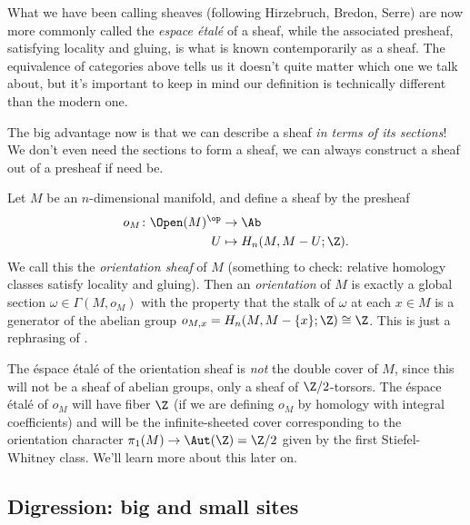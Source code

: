 \documentclass[11pt]{book}
\begin{document}
\begin{remark}[Important] What we have been calling sheaves (following Hirzebruch, Bredon, Serre) are now more commonly called the \emph{espace \'etal\'e} of a sheaf, while the associated presheaf, satisfying locality and gluing, is what is known contemporarily as a sheaf. The equivalence of categories above tells us it doesn't quite matter which one we talk about, but it's important to keep in mind our definition is technically different than the modern one.
\end{remark}


\begin{remark} The big advantage now is that we can describe a sheaf \emph{in terms of its sections}! We don't even need the sections to form a sheaf, we can always construct a sheaf out of a presheaf if need be.
\end{remark}

\begin{example} Let $M$ be an $n$-dimensional manifold, and define a sheaf by the presheaf
\begin{align*}
    o_M \colon \Open(M)^\op &\to \Ab \\
    U &\mapsto H_n(M,M-U;\Z).
\end{align*}
We call this the \emph{orientation sheaf} of $M$ (something to check: relative homology classes satisfy locality and gluing). Then an \emph{orientation} of $M$ is exactly a global section $\omega \in \Gamma(M,o_M)$ with the property that the stalk of $\omega$ at each $x\in M$ is a generator of the abelian group $o_{M,x} = H_n(M,M-\{x\};\Z)\cong \Z$. This is just a rephrasing of \cite[pp.~233--236]{Hatcher}.
\end{example}

\begin{remark} The \'espace \'etal\'e of the orientation sheaf is \emph{not} the double cover of $M$, since this will not be a sheaf of abelian groups, only a sheaf of $\Z/2$-torsors. The \'espace \'etal\'e of $o_M$ will have fiber $\Z$ (if we are defining $o_M$ by homology with integral coefficients) and will be the infinite-sheeted cover corresponding to the orientation character $\pi_1(M) \to \Aut(\Z) = \Z/2$ given by the first Stiefel-Whitney class. We'll learn more about this later on.
\end{remark}

\subsection{Digression: big and small sites}
\end{document}
